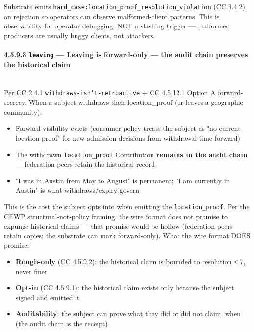 \documentclass[11pt]{article}
\begin{document}
Substrate emits \texttt{hard\_case:location\_proof\_resolution\_violation} (CC 3.4.2) on rejection so operators can observe malformed-client patterns. This is observability for operator debugging, NOT a slashing trigger — malformed producers are usually buggy clients, not attackers.


\paragraph{4.5.9.3 \texttt{leaving} — Leaving is forward-only — the audit chain preserves the historical claim}\mbox{}\\


Per CC 2.4.1 \texttt{withdraws-isn't-retroactive} + CC 4.5.12.1 Option A forward-secrecy. When a subject withdraws their location\_proof (or leaves a geographic community):


\begin{itemize}\setlength\itemsep{0pt}
\item Forward visibility evicts (consumer policy treats the subject as "no current location proof" for new admission decisions from withdrawal-time forward)
\item The withdrawn \texttt{location\_proof} Contribution \textbf{remains in the audit chain} — federation peers retain the historical record
\item "I was in Austin from May to August" is permanent; "I am currently in Austin" is what withdraws/expiry govern
\end{itemize}


This is the cost the subject opts into when emitting the \texttt{location\_proof}. Per the CEWP structural-not-policy framing, the wire format does not promise to expunge historical claims — that promise would be hollow (federation peers retain copies; the substrate can mark forward-only). What the wire format DOES promise:


\begin{itemize}\setlength\itemsep{0pt}
\item \textbf{Rough-only} (CC 4.5.9.2): the historical claim is bounded to resolution ≤ 7, never finer
\item \textbf{Opt-in} (CC 4.5.9.1): the historical claim exists only because the subject signed and emitted it
\item \textbf{Auditability}: the subject can prove what they did or did not claim, when (the audit chain is the receipt)
\end{itemize}
\end{document}
